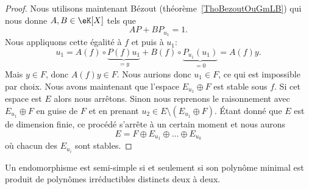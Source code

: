 \begin{proof}
    Nous utilisons maintenant Bézout (théorème~\ref{ThoBezoutOuGmLB}) qui nous donne \( A,B\in \eK[X]\) tels que
    \begin{equation}
        AP+BP_{u_1}=1.
    \end{equation}
    Nous appliquons cette égalité à \( f\) et puis à \( u_1\):
    \begin{equation}
        u_1=A(f)\circ \underbrace{P(f)u_1}_{=y}+B(f)\circ \underbrace{P_{u_1}(u_1)}_{=0}=A(f)y.
    \end{equation}
    Mais \( y\in F\), donc \( A(f)y\in F\). Nous aurions donc \( u_1\in F\), ce qui est impossible par choix. Nous avons maintenant que l'espace \( E_{u_1}\oplus F\) est stable sous \( f\). Si cet espace est \( E\) alors nous arrêtons. Sinon nous reprenons le raisonnement avec \( E_{u_1}\oplus F\) en guise de \( F\) et en prenant \( u_2\in E\setminus(E_{u_1}\oplus F)\). Étant donné que \( E\) est de dimension finie, ce procédé s'arrête à un certain moment et nous aurons
    \begin{equation}
        E=F\oplus E_{u_1}\oplus\ldots\oplus E_{u_k}
    \end{equation}
    où chacun des \( E_{u_i}\) sont stables.
\end{proof}

\begin{theorem} \label{ThoFgsxCE}
    Un endomorphisme est semi-simple si et seulement si son polynôme minimal est produit de polynômes irréductibles distincts deux à deux.
\end{theorem}

